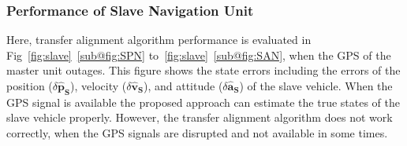 \documentclass[3p]{elsarticle}
\begin{document}
\subsubsection{Performance of Slave Navigation Unit}
\noindent Here, transfer alignment algorithm performance is evaluated in Fig~\ref{fig:slave}~\ref{sub@fig:SPN} to~\ref{fig:slave}~\ref{sub@fig:SAN}, when the GPS of the master unit outages.
This figure shows the state errors including the errors of the position (\(\delta \hat{\mathbf{p}}_{\mathbf{S}}\)), velocity (\(\delta \hat{\mathbf{v}}_{\mathbf{S}}\)), and attitude (\(\delta \hat{\mathbf{a}}_{\mathbf{S}}\)) of the slave vehicle. When the GPS signal is available
 the proposed approach can estimate the true states of the slave vehicle properly. However, the transfer alignment algorithm does not work correctly, when the GPS signals are disrupted and not available in some times.
\end{document}
